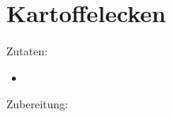 \section{Kartoffelecken}
Zutaten:
\begin{itemize}
    \item
\end{itemize}

Zubereitung:

\newpage
\mbox{}
\vfill
\begin{center}
\end{center}
\vfill
\mbox{ }
\newpage

